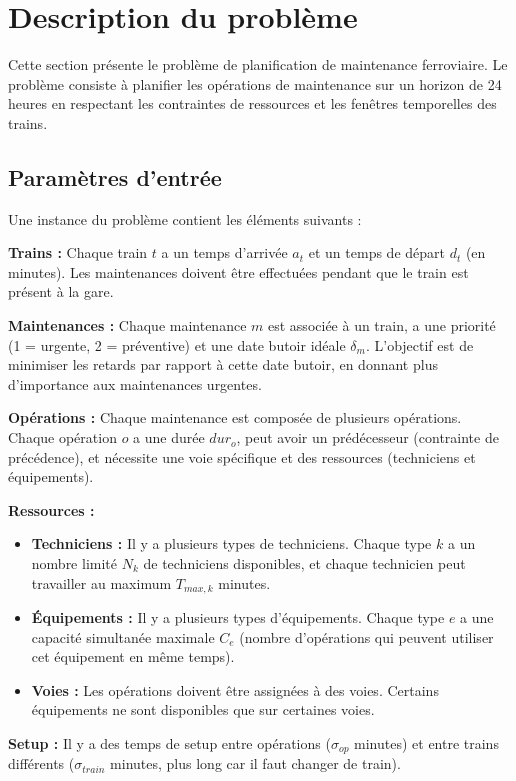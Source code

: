 \section{Description du problème}
\label{sec:probleme}

Cette section présente le problème de planification de maintenance ferroviaire. Le problème consiste à planifier les opérations de maintenance sur un horizon de 24 heures en respectant les contraintes de ressources et les fenêtres temporelles des trains.

\subsection{Paramètres d'entrée}

Une instance du problème contient les éléments suivants :

\textbf{Trains :} Chaque train $t$ a un temps d'arrivée $a_t$ et un temps de départ $d_t$ (en minutes). Les maintenances doivent être effectuées pendant que le train est présent à la gare.

\textbf{Maintenances :} Chaque maintenance $m$ est associée à un train, a une priorité (1 = urgente, 2 = préventive) et une date butoir idéale $\delta_m$. L'objectif est de minimiser les retards par rapport à cette date butoir, en donnant plus d'importance aux maintenances urgentes.

\textbf{Opérations :} Chaque maintenance est composée de plusieurs opérations. Chaque opération $o$ a une durée $dur_o$, peut avoir un prédécesseur (contrainte de précédence), et nécessite une voie spécifique et des ressources (techniciens et équipements).

\textbf{Ressources :} 
\begin{itemize}
    \item \textbf{Techniciens :} Il y a plusieurs types de techniciens. Chaque type $k$ a un nombre limité $N_k$ de techniciens disponibles, et chaque technicien peut travailler au maximum $T_{max,k}$ minutes.
    \item \textbf{Équipements :} Il y a plusieurs types d'équipements. Chaque type $e$ a une capacité simultanée maximale $C_e$ (nombre d'opérations qui peuvent utiliser cet équipement en même temps).
    \item \textbf{Voies :} Les opérations doivent être assignées à des voies. Certains équipements ne sont disponibles que sur certaines voies.
\end{itemize}

\textbf{Setup :} Il y a des temps de setup entre opérations ($\sigma_{op}$ minutes) et entre trains différents ($\sigma_{train}$ minutes, plus long car il faut changer de train).

